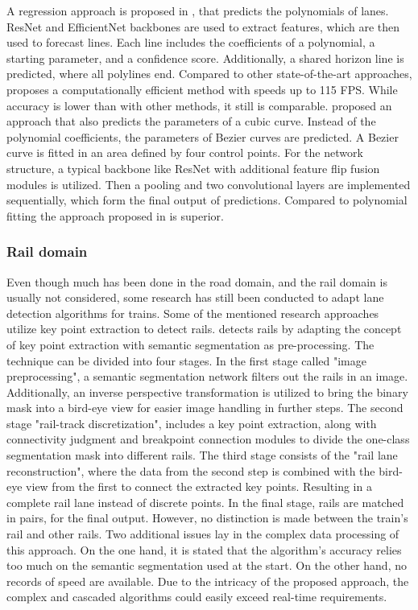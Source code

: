 A regression approach is proposed in \cite{PolyLaneNetRoad2021}, that predicts the polynomials of lanes.
ResNet and EfficientNet backbones are used to extract features, which are then used to forecast lines.
Each line includes the coefficients of a polynomial, a starting parameter, and a confidence score.
Additionally, a shared horizon line is predicted, where all polylines end.
Compared to other state-of-the-art approaches, \cite{PolyLaneNetRoad2021} proposes a computationally efficient method with speeds up to 115 \ac{FPS}.
While accuracy is lower than with other methods, it still is comparable.
\cite{DetectingLanesWithBezierCurves2023} proposed an approach that also predicts the parameters of a cubic curve.
Instead of the polynomial coefficients, the parameters of Bezier curves are predicted.
A Bezier curve is fitted in an area defined by four control points.
For the network structure, a typical backbone like ResNet with additional feature flip fusion modules is utilized.
Then a pooling and two convolutional layers are implemented sequentially, which form the final output of predictions.
Compared to polynomial fitting the approach proposed in \cite{DetectingLanesWithBezierCurves2023} is superior.

\subsubsection{Rail domain}

Even though much has been done in the road domain, and the rail domain is usually not considered, some research has still been conducted to adapt lane detection algorithms for trains.
Some of the mentioned research approaches utilize key point extraction to detect rails.
\cite{topologyGuidedRailDetection2022} detects rails by adapting the concept of key point extraction with semantic segmentation as pre-processing.
The technique can be divided into four stages.
In the first stage called "image preprocessing", a semantic segmentation network filters out the rails in an image.
Additionally, an inverse perspective transformation is utilized to bring the binary mask into a bird-eye view for easier image handling in further steps.
The second stage "rail-track discretization", includes a key point extraction, along with connectivity judgment and breakpoint connection modules to divide the one-class segmentation mask into different rails.
The third stage consists of the "rail lane reconstruction", where the data from the second step is combined with the bird-eye view from the first to connect the extracted key points. Resulting in a complete rail lane instead of discrete points.
In the final stage, rails are matched in pairs, for the final output.
However, no distinction is made between the train's rail and other rails.
Two additional issues lay in the complex data processing of this approach.
On the one hand, it is stated that the algorithm's accuracy relies too much on the semantic segmentation used at the start.
On the other hand, no records of speed are available.
Due to the intricacy of the proposed approach, the complex and cascaded algorithms could easily exceed real-time requirements.

